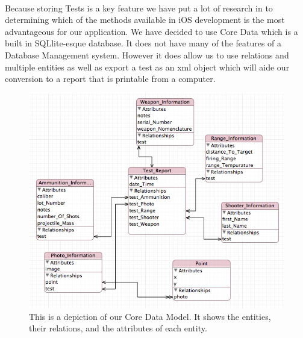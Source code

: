 \paragraph{} Because storing Tests is a key feature we have put a lot of research in to determining which of the methods available in iOS development is the most advantageous for our application. We have decided to use Core Data which is a built in SQLlite-esque database. It does not have many of the features of a Database Management system. However it does allow us to use relations and multiple entities as well as export a test as an xml object which will aide our conversion to a report that is printable from a computer.
\begin{figure}[H!htb]
\includegraphics[width=5in]{CoreDataModel.png}
\caption{This is a depiction of our Core Data Model. It shows the entities, their relations, and the attributes of each entity.}
\end{figure}
